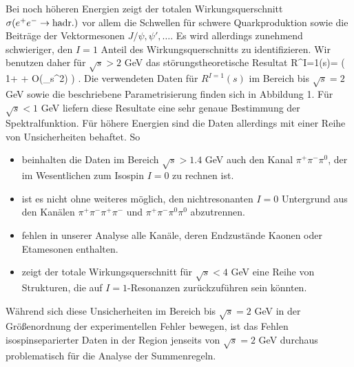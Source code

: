 Bei noch h\"oheren Energien zeigt der totalen Wirkungsquerschnitt 
$\sigma (e^+e^-\to \rm hadr.)$ vor allem die Schwellen f\"ur schwere
Quarkproduktion sowie die Beitr\"age der Vektormesonen 
$J/\psi,\psi ',\ldots$. Es wird allerdings zunehmend schwieriger, den 
$I=1$ Anteil des Wirkungsquerschnitts zu  identifizieren. Wir 
benutzen daher f\"ur $\sqrt s>2$ GeV das st\"orungstheoretische 
Resultat 
\be
 R^{I=1}(s)= \left( 1+
  + {\cal O}(\alpha_s^2) \right) .
\ee
Die verwendeten Daten f\"ur $R^{I=1}(s)$ im Bereich bis $\sqrt s=2$
GeV sowie die beschriebene Parametrisierung finden sich  in Abbildung 1.
F\"ur $\sqrt s<1$ GeV liefern diese Resultate eine sehr genaue 
Bestimmung der Spektralfunktion. F\"ur h\"ohere Energien sind die
Daten allerdings mit einer Reihe von Unsicherheiten behaftet. So
\begin{itemize}
\item{beinhalten die Daten im Bereich $\sqrt s>1.4$ GeV auch den 
Kanal $\pi^+\pi^-\pi^0$, der im Wesentlichen zum Isospin $I=0$
zu rechnen ist.}
\item{ist es nicht ohne weiteres m\"oglich, den nichtresonanten 
$I=0$ Untergrund aus den Kan\"alen $\pi^+\pi^-\pi^+\pi^-$ und 
$\pi^+\pi^-\pi^0\pi^0$ abzutrennen.}
\item{fehlen in unserer Analyse alle Kan\"ale, deren Endzust\"ande
 Kaonen oder Etamesonen enthalten.}
\item{zeigt der totale Wirkungsquerschnitt f\"ur $\sqrt s<4$ GeV
eine Reihe von Strukturen, die auf $I=1$-Resonanzen zur\"uckzuf\"uhren
sein k\"onnten.}
\end{itemize}
W\"ahrend sich diese Unsicherheiten im Bereich bis $\sqrt s=2$ GeV 
in der Gr\"o\ss enordnung der experimentellen Fehler bewegen, ist 
das Fehlen isospinseparierter Daten in der Region jenseits von
$\sqrt s=2$ GeV durchaus problematisch f\"ur die Analyse der
Summenregeln.

